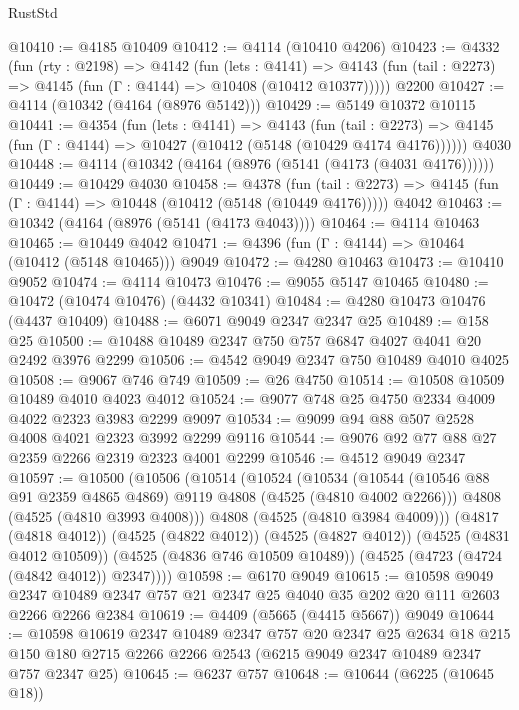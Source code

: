 \begin{lexlean}{RustStd}
\begin{coremodule}
@10410 := @4185 @10409
@10412 := @4114 (@10410 @4206)
@10423 := @4332
    (fun (rty : @2198) =>
    @4142
      (fun (lets : @4141) =>
      @4143 (fun (tail : @2273) => @4145 (fun (Γ : @4144) => @10408 (@10412 @10377)))))
    @2200
@10427 := @4114 (@10342 (@4164 (@8976 @5142)))
@10429 := @5149 @10372 @10115
@10441 := @4354
    (fun (lets : @4141) =>
    @4143
      (fun (tail : @2273) =>
      @4145 (fun (Γ : @4144) => @10427 (@10412 (@5148 (@10429 @4174 @4176))))))
    @4030
@10448 := @4114 (@10342 (@4164 (@8976 (@5141 (@4173 (@4031 @4176))))))
@10449 := @10429 @4030
@10458 := @4378
    (fun (tail : @2273) => @4145 (fun (Γ : @4144) => @10448 (@10412 (@5148 (@10449 @4176)))))
    @4042
@10463 := @10342 (@4164 (@8976 (@5141 (@4173 @4043))))
@10464 := @4114 @10463
@10465 := @10449 @4042
@10471 := @4396 (fun (Γ : @4144) => @10464 (@10412 (@5148 @10465))) @9049
@10472 := @4280 @10463
@10473 := @10410 @9052
@10474 := @4114 @10473
@10476 := @9055 @5147 @10465
@10480 := @10472 (@10474 @10476) (@4432 @10341)
@10484 := @4280 @10473 @10476 (@4437 @10409)
@10488 := @6071 @9049 @2347 @2347 @25
@10489 := @158 @25
@10500 := @10488 @10489 @2347 @750 @757 @6847 @4027 @4041 @20 @2492 @3976 @2299
@10506 := @4542 @9049 @2347 @750 @10489 @4010 @4025
@10508 := @9067 @746 @749
@10509 := @26 @4750
@10514 := @10508 @10509 @10489 @4010 @4023 @4012
@10524 := @9077 @748 @25 @4750 @2334 @4009 @4022 @2323 @3983 @2299 @9097
@10534 := @9099 @94 @88 @507 @2528 @4008 @4021 @2323 @3992 @2299 @9116
@10544 := @9076 @92 @77 @88 @27 @2359 @2266 @2319 @2323 @4001 @2299
@10546 := @4512 @9049 @2347
@10597 := @10500
    (@10506
      (@10514
        (@10524
          (@10534
            (@10544 (@10546 @88 @91 @2359 @4865 @4869) @9119 @4808 (@4525 (@4810 @4002 @2266)))
            @4808
            (@4525 (@4810 @3993 @4008)))
          @4808
          (@4525 (@4810 @3984 @4009)))
        (@4817 (@4818 @4012))
        (@4525 (@4822 @4012))
        (@4525 (@4827 @4012))
        (@4525 (@4831 @4012 @10509))
        (@4525 (@4836 @746 @10509 @10489))
        (@4525 (@4723 (@4724 (@4842 @4012)) @2347))))
@10598 := @6170 @9049
@10615 := @10598
    @9049
    @2347
    @10489
    @2347
    @757
    @21
    @2347
    @25
    @4040
    @35
    @202
    @20
    @111
    @2603
    @2266
    @2266
    @2384
@10619 := @4409 (@5665 (@4415 @5667)) @9049
@10644 := @10598
    @10619
    @2347
    @10489
    @2347
    @757
    @20
    @2347
    @25
    @2634
    @18
    @215
    @150
    @180
    @2715
    @2266
    @2266
    @2543
    (@6215 @9049 @2347 @10489 @2347 @757 @2347 @25)
@10645 := @6237 @757
@10648 := @10644 (@6225 (@10645 @18))

\end{coremodule}
\end{lexlean}
